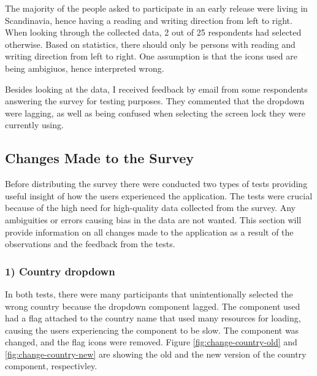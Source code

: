   The majority of the people asked to participate in an early release were living in Scandinavia, hence having a reading and writing direction from left to right. When looking through the collected data, 2 out of  25 respondents had selected otherwise. Based on statistics, there should only be persons with reading and writing direction from left to right. One assumption is that the icons used are being ambigiuos, hence interpreted wrong. 

  Besides looking at the data, I received feedback by email from some respondents answering the survey for testing purposes. They commented that the dropdown were lagging, as well as being confused when selecting the screen lock they were currently using. 

  \subsection{Changes Made to the Survey}
  Before distributing the survey there were conducted two types of tests providing useful insight of how the users experienced the application. The tests were crucial because of the high need for high-quality data collected from the survey. Any ambiguities or errors causing bias in the data are not wanted. This section will provide information on all changes made to the application as a result of the observations and the feedback from the tests.

    \subsubsection*{1) Country dropdown}
    In both tests, there were many participants that unintentionally selected the wrong country because the dropdown component lagged. The component used had a flag attached to the country name that used many resources for loading, causing the users experiencing the component to be slow. The component was changed, and the flag icons were removed. Figure \ref{fig:change-country-old} and \ref{fig:change-country-new} are showing the old and the new version of the country component, respectivley.

